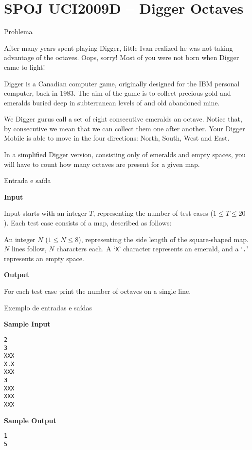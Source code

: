 \section{SPOJ UCI2009D -- Digger Octaves}

\begin{frame}[fragile]{Problema}

After many years spent playing Digger, little Ivan realized he was not taking advantage of the octaves. Oops, sorry! Most of you were not born when Digger came to light!

Digger is a Canadian computer game, originally designed for the IBM personal computer, back in 1983. The aim of the game is to collect precious gold and emeralds buried deep in subterranean levels of and old abandoned mine.

We Digger gurus call a set of eight consecutive emeralds an octave. Notice that, by consecutive we mean that we can collect them one after another. Your Digger Mobile is able to move in the four directions: North, South, West and East.

In a simplified Digger version, consisting only of emeralds and empty spaces, you will have to count how many octaves are present for a given map.

\end{frame}

\begin{frame}[fragile]{Entrada e saída}

\textbf{Input}

Input starts with an integer $T$, representing the number of test cases ($1\leq T\leq 20$). Each 
test case consists of a map, described as follows:

An integer $N$ ($1\leq N\leq 8$), representing the side length of the square-shaped map. $N$ lines 
follow, $N$ characters each. A `\texttt{X}' character represents an emerald, and a `\texttt{.}' 
represents an empty space.

\textbf{Output}

For each test case print the number of octaves on a single line.

\end{frame}

\begin{frame}[fragile]{Exemplo de entradas e saídas}

\begin{minipage}[t]{0.45\textwidth}
\textbf{Sample Input}
\begin{verbatim}
2
3
XXX
X.X
XXX
3
XXX
XXX
XXX
\end{verbatim}
\end{minipage}
\begin{minipage}[t]{0.5\textwidth}
\textbf{Sample Output}
\begin{verbatim}
1
5
\end{verbatim}
\end{minipage}
\end{frame}

